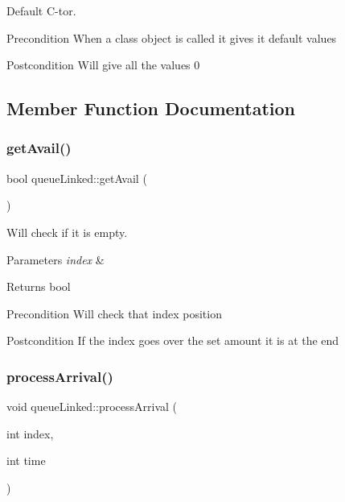 Default C-\/tor. 

\begin{DoxyPrecond}{Precondition}
When a class object is called it gives it default values 
\end{DoxyPrecond}
\begin{DoxyPostcond}{Postcondition}
Will give all the values 0 
\end{DoxyPostcond}


\subsection{Member Function Documentation}
\mbox{\label{classqueue_linked_ade8a9e0f04a4c28bc0d5683493ea949b}} 
\subsubsection{\texorpdfstring{get\+Avail()}{getAvail()}}
{\footnotesize\ttfamily bool queue\+Linked\+::get\+Avail (\begin{DoxyParamCaption}{ }\end{DoxyParamCaption})}



Will check if it is empty. 


\begin{DoxyParams}{Parameters}
{\em index} & \\
\hline
\end{DoxyParams}
\begin{DoxyReturn}{Returns}
bool 
\end{DoxyReturn}
\begin{DoxyPrecond}{Precondition}
Will check that index position 
\end{DoxyPrecond}
\begin{DoxyPostcond}{Postcondition}
If the index goes over the set amount it is at the end 
\end{DoxyPostcond}
\mbox{\label{classqueue_linked_a349d8f2de3ef18dd6668e4660b4e2aec}} 
\subsubsection{\texorpdfstring{process\+Arrival()}{processArrival()}}
{\footnotesize\ttfamily void queue\+Linked\+::process\+Arrival (\begin{DoxyParamCaption}\item[{int}]{index,  }\item[{int}]{time }\end{DoxyParamCaption})}



